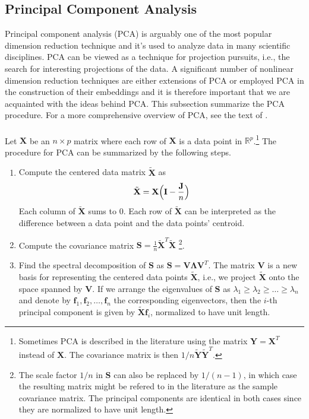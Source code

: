 \subsection{Principal Component Analysis}
\label{sec:princ-comp-analys}
Principal component analysis (PCA) is arguably one of the most popular
dimension reduction technique and it's used to analyze data in
many scientific disciplines. PCA can be viewed as a technique
for projection pursuits, i.e., the search for interesting projections
of the data. A significant number of nonlinear dimension 
reduction techniques are either extensions of PCA or employed PCA in
the construction of their embeddings and it is therefore important that
we are acquainted with the ideas behind PCA. This subsection summarize
the PCA procedure. For a more comprehensive overview of PCA, see the
text of \citet{jolliffe02:_princ_compon_analy}. \\ \\
%
Let $\mathbf{X}$ be an $n \times p$ matrix where each row of
$\mathbf{X}$ is a data point in $\mathbb{R}^{p}$.\footnote{Sometimes
  PCA is described in the literature using the matrix $\mathbf{Y} =
  \mathbf{X}^{T}$ instead of $\mathbf{X}$. The covariance matrix is
  then $1/n\tilde{\mathbf{Y}}\tilde{\mathbf{Y}}^{T}$.} The procedure
for PCA can be summarized by the following steps.
\begin{enumerate}
\item Compute the centered data matrix $\tilde{\mathbf{X}}$ as
  \begin{equation}
    \label{eq:97}
    \tilde{\mathbf{X}} = \mathbf{X}\Bigl(\mathbf{I} - \frac{\mathbf{J}}{n}\Bigr)
  \end{equation}
  Each column of $\tilde{\mathbf{X}}$ sums to $0$. Each row of
  $\tilde{\mathbf{X}}$ can be interpreted as the difference between
  a data point and the data points' centroid. 
\item Compute the covariance matrix $\mathbf{S} =
  \frac{1}{n}\tilde{\mathbf{X}}^{T}\tilde{\mathbf{X}}$ \footnote{The
    scale factor $1/n$ in $\mathbf{S}$ can also be replaced by
    $1/(n-1)$, in which case the resulting matrix might be refered to
    in the literature as the sample covariance matrix. The 
    principal components are identical in both cases since they are
    normalized to have unit length.}.
\item Find the spectral decomposition of $\mathbf{S}$ as $\mathbf{S} =
  \mathbf{V} \bm{\Lambda} \mathbf{V}^{T}$. The matrix $\mathbf{V}$ is
  a new basis for representing the centered data points $\tilde{\mathbf{X}}$,
  i.e., we project $\tilde{\mathbf{X}}$ onto the space spanned by
  $\mathbf{V}$.  If we arrange the eigenvalues of $\mathbf{S}$ as
  $\lambda_1 \geq \lambda_2 \geq \dots \geq \lambda_n$ and denote by
  $\mathbf{f}_1, \mathbf{f}_2, \dots, \mathbf{f}_n$ the corresponding
  eigenvectors, then the $i$-th principal component is given by
  $\tilde{\mathbf{X}}\mathbf{f}_i$, normalized to have unit length.
\end{enumerate}
